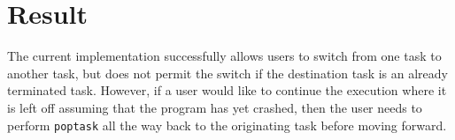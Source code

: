 \section{Result}
The current implementation successfully allows users to switch from one task to
another task, but does not permit the switch if the destination task is an already terminated
task. However, if a user would like to continue the execution where it is left
off assuming that the program has yet crashed, then the user needs to perform
\verb|poptask| all the way back to the originating task before moving forward.
